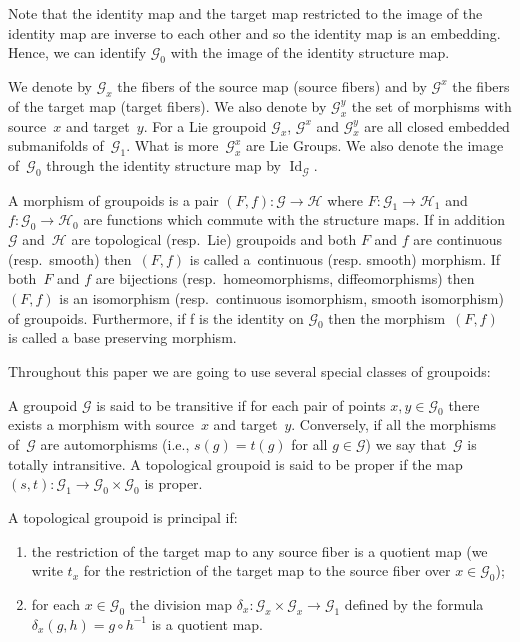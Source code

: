 \begin{rem} Note that the identity map and the target map restricted to the image of the identity map are inverse to each other and so the identity map is an embedding. Hence, we can identify $\mathcal{G}_0$ with the image of the identity structure map.
\end{rem}
We denote by $\mathcal{G}_x$ the fibers of the source map (source fibers) and by $\mathcal{G}^x$ the fibers of the target map (target fibers). We also denote by $\mathcal{G}^y_x$ the set of morphisms with source~$x$ and target~$y$. For a Lie groupoid $\mathcal{G}_x$, $\mathcal{G}^x$ and $\mathcal{G}^y_x$ are all closed embedded submanifolds of~$\mathcal{G}_1$. What is more~$\mathcal{G}^x_x$ are Lie Groups. We also denote the image of~$\mathcal{G}_0$ through the identity structure map by $\operatorname{Id}_{\mathcal{G}}$.
\begin{defi} A morphism of groupoids is a pair $(F,f)\colon \mathcal{G}\rightarrow\mathcal{H}$ where $F\colon \mathcal{G}_1\rightarrow\mathcal{H}_1$ and $f\colon \mathcal{G}_0\rightarrow\mathcal{H}_0$ are functions which commute with the structure maps. If in addition~$\mathcal{G}$ and~$\mathcal{H}$ are topological (resp.\ Lie) groupoids and both $F$ and $f$ are continuous (resp.\ smooth) then~$(F,f)$ is called a~continuous (resp. smooth) morphism. If both~$F$ and $f$ are bijections (resp.\ homeo\-morphisms, diffeomorphisms) then $(F,f)$ is an isomorphism (resp.\ continuous isomorphism, smooth isomorphism) of groupoids. Furthermore, if f is the identity on $\mathcal{G}_0$ then the morphism~$(F,f)$ is called a base preserving morphism.
\end{defi}
Throughout this paper we are going to use several special classes of groupoids:
\begin{defi} A groupoid $\mathcal{G}$ is said to be transitive if for each pair of points $x,y\in\mathcal{G}_0$ there exists a morphism with source~$x$ and target~$y$. Conversely, if all the morphisms of~$\mathcal{G}$ are automorphisms (i.e., $s(g) = t(g)$ for all $g\in \mathcal{G}$) we say that~$\mathcal{G}$ is totally intransitive. A topological groupoid is said to be proper if the map $(s,t)\colon \mathcal{G}_1\rightarrow\mathcal{G}_0\times\mathcal{G}_0$ is proper.
\end{defi}
\begin{defi} A topological groupoid is principal if:
\begin{enumerate}\itemsep=0pt
\item[1)] the restriction of the target map to any source fiber is a quotient map (we write $t_x$ for the restriction of the target map to the source fiber over $x\in\mathcal{G}_0$);
\item[2)] for each $x\in\mathcal{G}_0$ the division map $\delta_x\colon \mathcal{G}_x\times\mathcal{G}_x\rightarrow\mathcal{G}_1$ defined by the formula $\delta_x(g,h)=g\circ h^{-1}$ is a quotient map.
\end{enumerate}
\end{defi}
